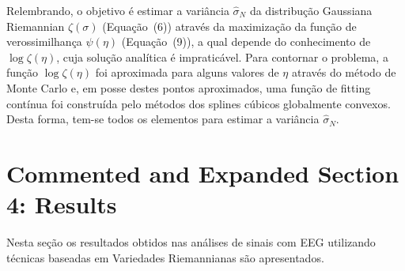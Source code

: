 \documentclass[a4paper,titlepage]{article}
\begin{document}
\begin{center}
  \vspace{1em}
  \vspace{1em}
\end{center}

Relembrando, o objetivo é estimar a variância $\hat{\sigma}_N$ da distribução
Gaussiana Riemannian $\zeta(\sigma)$ (Equação~(6)) através da maximização da
função de verossimilhança $\psi(\eta)$ (Equação~(9)), a qual depende do
conhecimento de $\log \zeta(\eta)$, cuja solução analítica é impraticável.
Para contornar o problema, a função $\log \zeta(\eta)$ foi aproximada para
alguns valores de $\eta$ através do método de Monte Carlo e, em posse destes
pontos aproximados, uma função de fitting contínua foi construída pelo métodos
dos splines cúbicos globalmente convexos. Desta forma, tem-se todos os
elementos para estimar a variância $\hat{\sigma}_N$.

\section{Commented and Expanded Section 4: Results}
Nesta seção os resultados obtidos nas análises de sinais com EEG utilizando
técnicas baseadas em Variedades Riemannianas são apresentados.

\begin{center}
  \vspace{1em}
  \vspace{1em}
\end{center}
\end{document}
